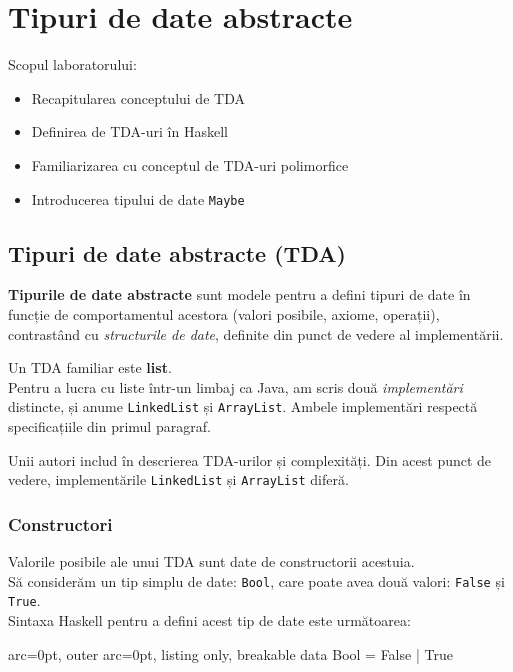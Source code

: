 \section*{ Tipuri de date abstracte }

Scopul laboratorului:
\begin{itemize}
	\item  Recapitularea conceptului de TDA
	\item  Definirea de TDA-uri în Haskell
	\item  Familiarizarea cu conceptul de TDA-uri polimorfice
	\item  Introducerea tipului de date \texttt{Maybe}
\end{itemize}


\subsection*{ Tipuri de date abstracte (TDA) }

\textbf{Tipurile de date abstracte} sunt modele pentru a defini tipuri de date în funcție de comportamentul acestora (valori posibile, axiome, operații), contrastând cu \textit{structurile de date}, definite din punct de vedere al implementării.

Un TDA familiar este \textbf{list}. \\Pentru a lucra cu liste într-un limbaj ca Java, am scris două \textit{implementări} distincte, și anume \texttt{LinkedList} și \texttt{ArrayList}. Ambele implementări respectă specificațiile din primul paragraf.

\begin{tcolorbox}[colback=yellow!40, colframe=yellow!60, breakable]
Unii autori includ în descrierea TDA-urilor și complexități. Din acest punct de vedere, implementările 
\texttt{LinkedList} și \texttt{ArrayList} diferă.
\end{tcolorbox}


\subsubsection*{ Constructori }

Valorile posibile ale unui TDA sunt date de constructorii acestuia.\\Să considerăm un tip simplu de date: \texttt{Bool}, care poate avea două valori: \texttt{False} și \texttt{True}.\\Sintaxa Haskell pentru a defini acest tip de date este următoarea:


\begin{tcblisting}{ arc=0pt, outer arc=0pt, listing only, breakable}
data Bool = False | True

\end{tcblisting}


